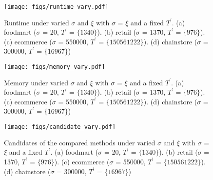 \documentclass[journal]{IEEEtran}
\begin{document}
\begin{figure}[!htb]
	\centering
	\texttt{[image: figs/runtime\_vary.pdf]}
	\caption{Runtime under varied $\sigma$ and $\xi$ with $\sigma$ = $\xi$ and a fixed $T^\prime$. (a) foodmart ($\sigma$ = 20, $T^\prime$ = $\{1340\}$). (b) retail ($\sigma$ = 1370, $T^\prime$ = $\{976\}$). (c) ecommerce ($\sigma$ = 550000, $T^\prime$ = $\{150561222\}$). (d) chainstore ($\sigma$ = 300000, $T^\prime$ = $\{16967\}$)}
	\label{fig:runtime}
\end{figure}


\begin{figure}[!htb]
	\centering
	\texttt{[image: figs/memory\_vary.pdf]}
	\caption{Memory under varied $\sigma$ and $\xi$ with $\sigma$ = $\xi$ and a fixed $T^\prime$. (a) foodmart ($\sigma$ = 20, $T^\prime$ = $\{1340\}$). (b) retail ($\sigma$ = 1370, $T^\prime$ = $\{976\}$). (c) ecommerce ($\sigma$ = 550000, $T^\prime$ = $\{150561222\}$). (d) chainstore ($\sigma$ = 300000, $T^\prime$ = $\{16967\}$)}
	\label{fig:memory}
\end{figure}

\begin{figure}[!h]
	\centering
	\texttt{[image: figs/candidate\_vary.pdf]}
	\caption{Candidates of the compared methods under varied $\sigma$ and $\xi$ with $\sigma$ = $\xi$ and a fixed $T^\prime$. (a) foodmart ($\sigma$ = 20, $T^\prime$ = $\{1340\}$). (b) retail ($\sigma$ = 1370, $T^\prime$ = $\{976\}$). (c) ecommerce ($\sigma$ = 550000, $T^\prime$ = $\{150561222\}$). (d) chainstore ($\sigma$ = 300000, $T^\prime$ = $\{16967\}$)}
	\label{fig:candities}
\end{figure}
\end{document}
